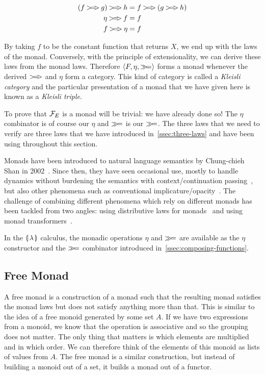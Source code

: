 \begin{align*}
  (f \kleisli g) \kleisli h &= f \kleisli (g \kleisli h) \\
  \eta \kleisli f &= f \\
  f \kleisli \eta &= f
\end{align*}

By taking $f$ to be the constant function that returns $X$, we end up with
the laws of the monad. Conversely, with the principle of extensionality, we
can derive these laws from the monad laws. Therefore
$\left<F, \eta, \mathbin{\gg\!=}\right>$ forms a monad whenever the derived
$\mathbin{>\!=\!\!>}$ and $\eta$ form a category. This kind of category is called a
\emph{Kleisli category} and the particular presentation of a monad that we
have given here is known as a \emph{Kleisli triple}.

To prove that $\mathcal{F}_E$ is a monad will be trivial: we have already done so!
The $\eta$ combinator is of course our $\eta$ and $\mathbin{\gg\!=}$ is our
$\mathbin{\gg\!=}$. The three laws that we need to verify are three laws that we
have introduced in~\ref{ssec:three-laws} and have been using throughout
this section.

Monads have been introduced to natural language semantics by Chung-chieh
Shan in 2002~\cite{shan2002monads}. Since then, they have seen occasional
use, mostly to handle dynamics without burdening the semantics with
context/continuation passing~\cite{unger2011dynamic,champollion2015back},
but also other phenomena such as conventional
implicature/opacity~\cite{giorgolo2011multidimensional,giorgolo2012monads,giorgolo2014monads}. The
challenge of combining different phenomena which rely on different monads
has been tackled from two angles: using distributive laws for
monads~\cite{giorgolo2015natural} and using monad
transformers~\cite{charlow2014semantics,barker2015monads}.

In the $\llparenthesis \, \lambda \, \rrparenthesis$ calculus, the monadic operations $\eta$ and
$\mathbin{\gg\!=}$ are available as the $\eta$ constructor and the $\mathbin{\gg\!=}$
combinator introduced in~\ref{ssec:composing-functions}.

\subsection{Free Monad}
\label{ssec:free-monad}

A free monad is a construction of a monad such that the resulting monad
satisfies the monad laws but does not satisfy anything more than that. This
is similar to the idea of a free monoid generated by some set $A$. If we
have two expressions from a monoid, we know that the operation is
associative and so the grouping does not matter. The only thing that
matters is which elements are multiplied and in which order. We can
therefore think of the elements of this monoid as lists of values from
$A$. The free monad is a similar construction, but instead of building a
monoid out of a set, it builds a monad out of a functor.

